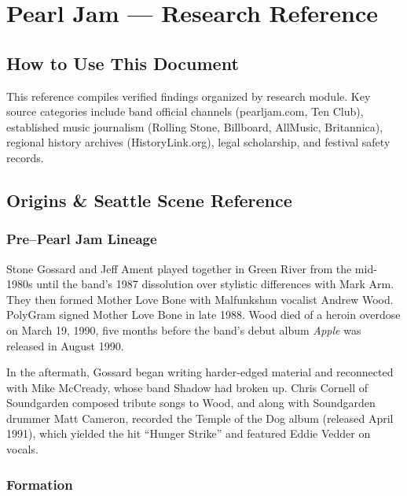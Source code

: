 \documentclass[11pt,letterpaper]{article}
\newcommand{\stageheader}[2]{%
  \noindent\colorbox{#2}{\makebox[\textwidth][l]{%
    \textcolor{white}{\bfseries\sffamily\hspace{6pt}#1\hspace{6pt}}}}%
  \vspace{0.5em}\par%
}
\begin{document}
\newpage

\stageheader{STAGE 2 --- RESEARCH REFERENCE}{secondary}

\section{Pearl Jam --- Research Reference}

\subsection{How to Use This Document}

This reference compiles verified findings organized by research module. Key source categories include band official channels (pearljam.com, Ten Club), established music journalism (Rolling Stone, Billboard, AllMusic, Britannica), regional history archives (HistoryLink.org), legal scholarship, and festival safety records.

\subsection{Origins \& Seattle Scene Reference}

\subsubsection{Pre--Pearl Jam Lineage}

Stone Gossard and Jeff Ament played together in Green River from the mid-1980s until the band's 1987 dissolution over stylistic differences with Mark Arm. They then formed Mother Love Bone with Malfunkshun vocalist Andrew Wood. PolyGram signed Mother Love Bone in late 1988. Wood died of a heroin overdose on March 19, 1990, five months before the band's debut album \textit{Apple} was released in August 1990.

In the aftermath, Gossard began writing harder-edged material and reconnected with Mike McCready, whose band Shadow had broken up. Chris Cornell of Soundgarden composed tribute songs to Wood, and along with Soundgarden drummer Matt Cameron, recorded the Temple of the Dog album (released April 1991), which yielded the hit ``Hunger Strike'' and featured Eddie Vedder on vocals.

\subsubsection{Formation}
\end{document}
